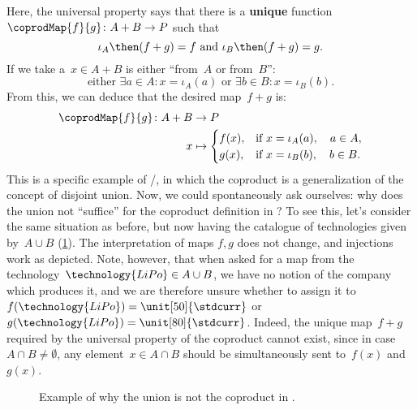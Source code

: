 \begin{example}
  Here, the universal property says that there is a \textbf{unique} function~$\coprodMap{f}{g}\colon A+B\to P$ such that
  \begin{equation}\label{eq:exa-batt-factoring-maps}
    \iota_A\then (f+ g)=f \text{ and }\iota_B\then (f+ g)=g.
  \end{equation}
  If we take a~$x\in A+B$ is either ``from~$A$ or from~$B$'':
  \begin{equation}\label{eq:exa-batt-explain-sum-map}
    \text{either } \exists a\in A:x=\iota_A(a) \text{ or }\exists b\in B:x=\iota_B(b).
  \end{equation}
  From this, we can deduce that the desired map~$f+g$ is:
  \begin{equation}\label{eq:exa-batt-def-sum-map}
    \begin{aligned}
      \coprodMap{f}{g} \colon  A + B &\to P \\
      x &   \mapsto
      \begin{cases}
        f(x),& \text{if } x=\iota_A(a),\quad a \in A, \\
        g(x),& \text{if } x=\iota_B(b),\quad b \in B.
      \end{cases}
    \end{aligned}
  \end{equation}
  This is a specific example of \Set/\FinSet, in which the coproduct is a generalization of the concept of disjoint union. Now, we could spontaneously ask ourselves: why does the union not ``suffice'' for the coproduct definition in \Set? To see this, let's consider the same situation as before, but now having the catalogue of technologies given by~$A\cup B$ (\cref{fig:coprod_batteries_2}). The interpretation of maps $f,g$ does not change, and injections work as depicted. Note, however, that when asked for a map from the technology~$\technology{LiPo}\in A\cup B$, we have no notion of the company which produces it, and we are therefore unsure whether to assign it to~$f(\technology{LiPo})=\unit[50]{\stdcurr}$ or~$g(\technology{LiPo})=\unit[80]{\stdcurr}$. Indeed, the unique map~$f+g$ required by the universal property of the coproduct cannot exist, since in case~$A\cap B\neq \emptyset$, any element~$x\in A\cap B$ should be simultaneously sent to~$f(x)$ and~$g(x)$.

  \begin{figure}[h!]
    \centering
    \caption{Example of why the union is not the coproduct in \Set.}
    \label{fig:coprod_batteries_2}
  \end{figure}
\end{example}


